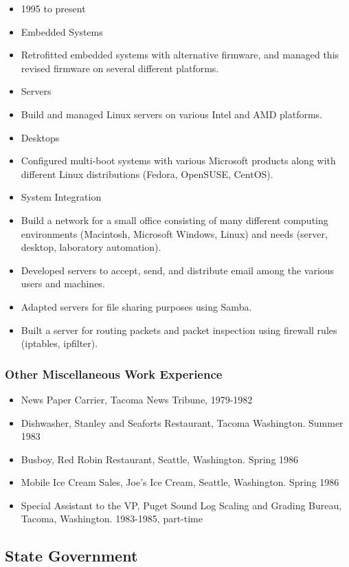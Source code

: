 \documentclass[12pt]{article}
\begin{document}
\begin{itemize}
\item 1995 to present
\item
  Embedded Systems
\item
  Retrofitted embedded systems with alternative firmware, and managed
  this revised firmware on several different platforms.
\item
  Servers
\item
  Build and managed Linux servers on various Intel and AMD platforms.
\item
  Desktops
\item
  Configured multi-boot systems with various Microsoft products along
  with different Linux distributions (Fedora, OpenSUSE, CentOS).
\item
  System Integration
\item
  Build a network for a small office consisting of many different
  computing environments (Macintosh, Microsoft Windows, Linux) and needs
  (server, desktop, laboratory automation).
\item
  Developed servers to accept, send, and distribute email among the
  various users and machines.
\item
  Adapted servers for file sharing purposes using Samba.
\item
  Built a server for routing packets and packet inspection using
  firewall rules (iptables, ipfilter).
\end{itemize}


\subsubsection{Other Miscellaneous Work
Experience}

\begin{itemize}
\item
  News Paper Carrier, Tacoma News Tribune, 1979-1982
\item
  Dishwasher, Stanley and Seaforts Restaurant, Tacoma Washington. Summer
  1983
\item
  Busboy, Red Robin Restaurant, Seattle, Washington. Spring 1986
\item
  Mobile Ice Cream Sales, Joe's Ice Cream, Seattle, Washington. Spring
  1986
\item
  Special Assistant to the VP, Puget Sound Log Scaling and Grading
  Bureau, Tacoma, Washington. 1983-1985, part-time
\end{itemize}


\subsection {State Government}
\end{document}
